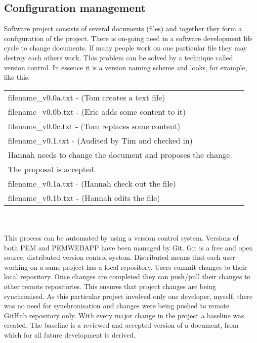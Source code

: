 \documentclass[12pt, a4paper]{report}   %
\begin{document}
\begin{enumerate}
\subsection{Configuration management}
Software project consists of several documents (files) and together they form a configuration of the project. There is on-going need in a software development life cycle to change documents. If many people work on one particular file they may destroy each others work. This problem can be solved by a technique called version control. In essence it is a version naming scheme and looks, for example, like this:\\


\begin{tabular}{ll}
filename\_v0.0a.txt - (Tom creates a text file)\\
filename\_v0.0b.txt - (Eric adds some content to it)\\
filename\_v0.0c.txt - (Tom replaces some content)\\
filename\_v0.1.txt - (Audited by Tim and checked in)\\
Hannah needs to change the document and proposes the change.\\
The proposal is accepted.\\
filename\_v0.1a.txt - (Hannah check out the file)\\
filename\_v0.1b.txt - (Hannah edits the file)\\
\end{tabular}\\ \\	
	
	
This process can be automated by using a version control system. Versions of both PEM and PEMWEBAPP have been managed by Git. Git is a free and open source, distributed version control system. Distributed means that each user working on a same project has a local repository. Users commit changes to their local repository. Once changes are completed they can push/pull their changes to other remote repositories. This ensures that project changes are being synchronised. As this particular project involved only one developer, myself, there was no need for synchronisation and changes were being pushed to remote GitHub repository only.
With every major change in the project a baseline was created. The baseline is a reviewed and accepted version of a document, from which for all future development is derived.\\ \\
	

\end{enumerate}
\end{document}
